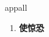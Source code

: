 
\begin{frame}
{\huge appall}
\begin{center}
\begin{enumerate}\Large
  \item \textbf{使惊恐}
\end{enumerate}
\end{center}
\end{frame}
